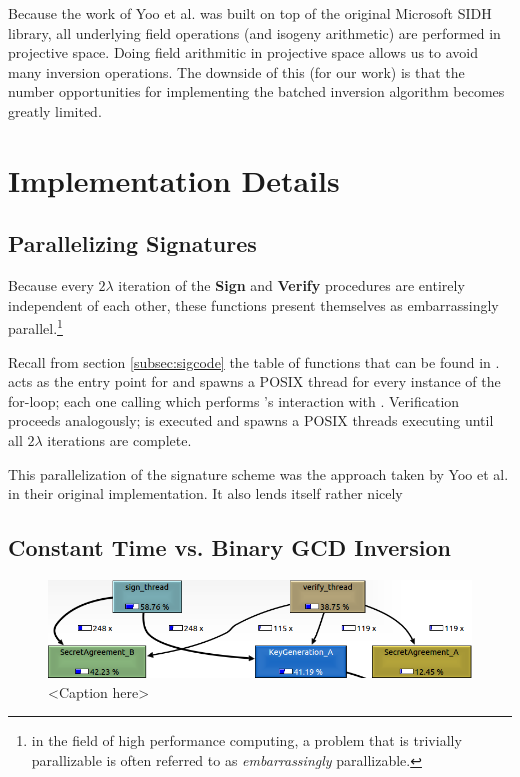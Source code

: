 Because the work of Yoo et al. was built on top of the original Microsoft SIDH library, all underlying field operations (and isogeny arithmetic) are performed in projective space. Doing field arithmitic in projective space allows us to avoid many inversion operations. The downside of this (for our work) is that the number opportunities for implementing the batched inversion algorithm becomes greatly limited.\\

\section{Implementation Details}

\subsection{Parallelizing Signatures}

Because every $2\lambda$ iteration of the \textbf{Sign} and \textbf{Verify} procedures are entirely independent of each other, these functions present themselves as embarrassingly parallel.\footnote{in the field of high performance computing, a problem that is trivially parallizable is often referred to as \emph{embarrassingly} parallizable.} 

Recall from section \ref{subsec:sigcode} the table of functions that can be found in .  acts as the entry point for  and spawns a POSIX thread for every instance of the for-loop; each one calling  which performs \bob's interaction with \randall. Verification proceeds analogously;  is executed and spawns a POSIX threads executing  until all $2\lambda$ iterations are complete.

This parallelization of the signature scheme was the approach taken by Yoo et al. in their original implementation. It also lends itself rather nicely 

\subsection{Constant Time vs. Binary GCD Inversion}

\begin{figure}[htb]
\centering
\includegraphics[scale=0.5]{signandverifycall} %
\caption{<Caption here>}
\label{fig:label} %
\end{figure}

